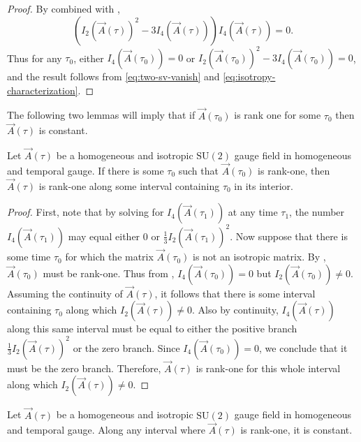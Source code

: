 \begin{proof}
By  combined with , 
\begin{equation}
\left(I_{2}(\vec{A}(\tau))^{2}-3I_{4}(\vec{A}(\tau))\right)I_{4}(\vec{A}(\tau))=0.\label{eq:reduced-isotropy-A}
\end{equation}
 Thus for any $\tau_{0}$, either $I_{4}(\vec{A}(\tau_{0}))=0$ or $I_{2}(\vec{A}(\tau_{0}))^{2}-3I_{4}(\vec{A}(\tau_{0}))=0$, and the result follows from \eqref{eq:two-sv-vanish} and \eqref{eq:isotropy-characterization}.
\end{proof}
The following two lemmas will imply that if $\vec{A}(\tau_{0})$ is rank one for some $\tau_{0}$ then $\vec{A}(\tau)$ is constant. 
\begin{lem}
\label{lem:iso-open}Let $\vec{A}(\tau)$ be a homogeneous and isotropic $\mathrm{SU}(2)$ gauge field in homogeneous and temporal gauge. If there is some $\tau_{0}$ such that $\vec{A}(\tau_{0})$ is rank-one, then $\vec{A}(\tau)$ is rank-one along some interval containing $\tau_{0}$ in its interior. 
\end{lem}

\begin{proof}
First, note that by solving  for $I_{4}(\vec{A}(\tau_{1}))$ at any time $\tau_{1}$, the number $I_{4}(\vec{A}(\tau_{1}))$ may equal either $0$ or $\tfrac{1}{3}I_{2}(\vec{A}(\tau_{1}))^{2}$. Now suppose that there is some time $\tau_{0}$ for which the matrix $\vec{A}(\tau_{0})$ is not an isotropic matrix. By , $\vec{A}(\tau_{0})$ must be rank-one. Thus from , $I_{4}(\vec{A}(\tau_{0}))=0$ but $I_{2}(\vec{A}(\tau_{0}))\neq0$. Assuming the continuity of $\vec{A}(\tau)$, it follows that there is some interval containing $\tau_{0}$ along which $I_{2}(\vec{A}(\tau))\neq0$. Also by continuity, $I_{4}(\vec{A}(\tau))$ along this same interval must be equal to either the positive branch $\tfrac{1}{3}I_{2}(\vec{A}(\tau))^{2}$ or the zero branch. Since $I_{4}(\vec{A}(\tau_{0}))=0$, we conclude that it must be the zero branch. Therefore, $\vec{A}(\tau)$ is rank-one for this whole interval along which $I_{2}(\vec{A}(\tau))\neq0$.
\end{proof}
\begin{lem}
\label{lem:rank-one-const}Let $\vec{A}(\tau)$ be a homogeneous and isotropic $\mathrm{SU}(2)$ gauge field in homogeneous and temporal gauge. Along any interval where $\vec{A}(\tau)$ is rank-one, it is constant. 
\end{lem}

